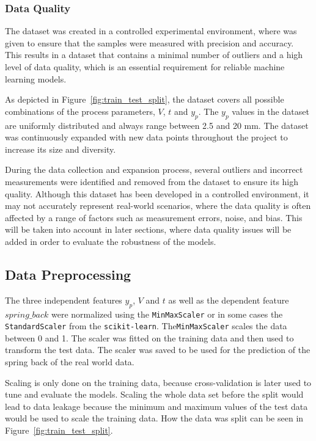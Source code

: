 \subsubsection{Data Quality}
The dataset was created in a controlled experimental environment, where
was given to ensure that the samples were measured with precision and accuracy.
This results in a dataset that contains a minimal number of outliers and a
high level of data quality, which is an essential requirement for reliable machine
learning models.

As depicted in Figure~\ref{fig:train_test_split}, the dataset covers all possible
combinations of the process parameters, $V$, $t$ and $y_p$.
The $y_p$ values in the dataset are uniformly distributed and always range between 2.5
and 20 mm.
The dataset was continuously expanded with new data points throughout the project to
increase its size and diversity.

During the data collection and expansion process, several outliers and incorrect
measurements were identified and removed from the dataset to ensure its high quality.
Although this dataset has been developed in a controlled environment, it may not
accurately represent real-world scenarios, where the data quality is often affected by
a range of factors such as measurement errors, noise, and bias.
This will be taken into account in later sections, where data quality issues will be
added in order to evaluate the robustness of the models.

\subsection{Data Preprocessing}\label{subsec:data-preprocessing}
The three independent features $y_p$, $V$ and $t$ as well as the dependent
feature $spring\_back$ were normalized using the \texttt{MinMaxScaler} or in some cases
the \texttt{StandardScaler} from the \texttt{scikit-learn}\cite{scikit-learn}.
The\texttt{MinMaxScaler} scales the data between 0 and 1.
The scaler was fitted on the training data and then used to transform the test data.
The scaler was saved to be used for the prediction of the spring back of the real world
data.

Scaling is only done on the training data, because cross-validation is later used to
tune and evaluate the models.
Scaling the whole data set before the split would lead to data leakage because the
minimum and maximum values of the test data would be used to scale the training data.
How the data was split can be seen in Figure~\ref{fig:train_test_split}.

